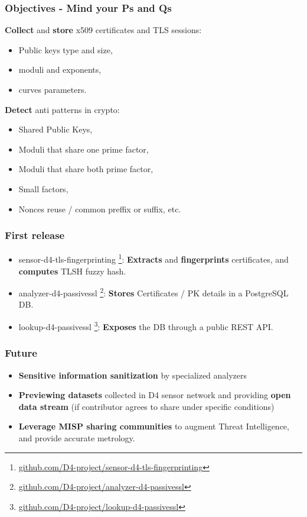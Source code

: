 \documentclass{beamer}
\begin{document}
\begin{frame}
   \frametitle{Objectives - Mind your Ps and Qs}
   {\bf Collect} and {\bf store} x509 certificates and TLS sessions:
        \begin{itemize}
        \item Public keys type and size,
        \item moduli and exponents,
        \item curves parameters.
        \end{itemize}
        {\bf Detect} anti patterns in crypto:
        \begin{itemize}
          \item Shared Public Keys,
          \item Moduli that share one prime factor,
          \item Moduli that share both prime factor,
          \item Small factors,
          \item Nonces reuse / common preffix or suffix, etc. 
        \end{itemize}
        
\end{frame}

\begin{frame}
  \frametitle{First release}
  \begin{itemize}
  \item[\checkmark] sensor-d4-tls-fingerprinting
    \footnote{\url{github.com/D4-project/sensor-d4-tls-fingerprinting}}:
    {\bf Extracts} and {\bf fingerprints} certificates, and {\bf computes} TLSH fuzzy hash.
  \item[\checkmark] analyzer-d4-passivessl
    \footnote{\url{github.com/D4-project/analyzer-d4-passivessl}}:
    {\bf Stores} Certificates / PK details in a PostgreSQL DB.
  \item lookup-d4-passivessl
    \footnote{\url{github.com/D4-project/lookup-d4-passivessl}}:
    {\bf Exposes} the DB through a public REST API.
  \end{itemize}
\end{frame}

\begin{frame}
  \frametitle{Future}
     \begin{itemize}
     \item {\bf Sensitive information sanitization} by specialized analyzers 
     \item {\bf Previewing datasets} collected in D4 sensor network and providing {\bf open data stream} (if contributor agrees to share under specific conditions)
     \item {\bf Leverage MISP sharing communities} to augment Threat
       Intelligence, and provide accurate metrology. 
\end{itemize}
\end{frame}
\end{document}
